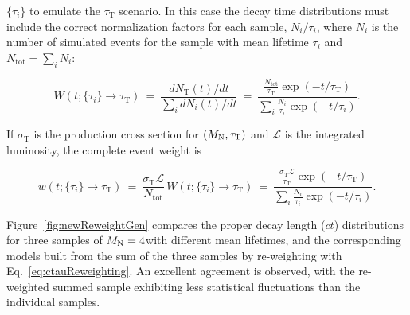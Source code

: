 $\{\tau_i\}$ to emulate the $\tau_{\mathrm T}$ scenario. In this case the
decay time distributions must include the correct normalization
factors for each sample, $N_i/\tau_i$, where $N_i$ is the number of
simulated events for the sample with mean lifetime $\tau_i$ and
$N_{\mathrm{tot}} = \sum_i N_i$:
\begin{linenomath}
  \begin{equation*}
    W(t; \{\tau_i\}\to\tau_{\mathrm T}) ~=~ \frac{dN_{\mathrm T}(t)/dt}{\sum_i dN_i(t)/dt} ~=~
    \frac{\frac{N_{\mathrm{tot}}}{\tau_{\mathrm{T}}}\exp{(-t/\tau_{\mathrm{T}})}}
         {\sum_i\frac{N_{i}}{\tau_i}\exp{(-t/\tau_i)}}.
  \end{equation*}
\end{linenomath}
If $\sigma_{\mathrm{T}}$ is the production cross section for
$(M_{\mathrm{N}},\tau_{\mathrm T})$ and $\mathcal{L}$ is the integrated luminosity,
the complete event weight is
\begin{linenomath}
  \begin{equation}
    w(t; \{\tau_i\}\to\tau_{\mathrm T}) ~=~
    \frac{\sigma_{\mathrm{T}}\mathcal{L}}{N_{\mathrm{tot}}}\,W(t;\{\tau_i\}\to\tau_{\mathrm T})
     ~=~ \frac{\frac{\sigma_{\mathrm{T}}\mathcal{L}}{\tau_{\mathrm{T}}}\exp{(-t/\tau_{\mathrm{T}})}}
         {\sum_i\frac{N_{i}}{\tau_i}\exp{(-t/\tau_i)}}.
  \label{eq:ctauReweighting}
  \end{equation}
\end{linenomath}
Figure~\ref{fig:newReweightGen} compares the proper decay length ($ct$)
distributions for three samples of $M_{\mathrm{N}}=4$\GeV with different mean
lifetimes, and the corresponding models built from the sum of the
three samples by re-weighting with Eq.~\ref{eq:ctauReweighting}. An
excellent agreement is observed, with the re-weighted summed sample
exhibiting less statistical fluctuations than the individual samples.
